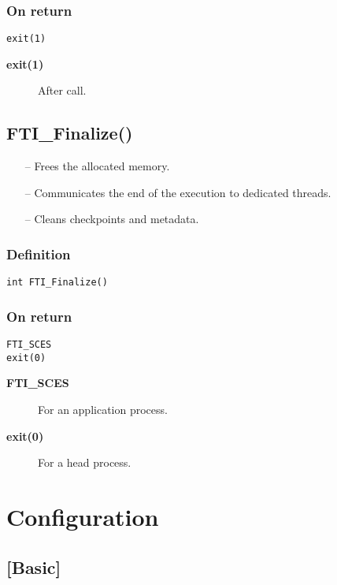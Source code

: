 \documentclass{refrep}
\begin{document}
\subsection*{On return}
\begin{lstlisting}[frame=single]
exit(1)
\end{lstlisting}
\begin{description}
\item[\textbf{exit(1)}] After call.
\end{description}
\newpage
\section{\asciifamily FTI\_Finalize()}\label{sec:ftifinalize}
\begin{framed}
\begin{itemize}
\item[--] Frees the allocated memory.
\item[--] Communicates the end of the execution to dedicated threads.
\item[--] Cleans checkpoints and metadata.
\end{itemize}
\end{framed}
\subsection*{Definition}
\begin{lstlisting}[frame=single]
int FTI_Finalize()
\end{lstlisting}
\subsection*{On return}
\begin{lstlisting}[frame=single]
FTI_SCES
exit(0)
\end{lstlisting}
\begin{description}
\item[\textbf{FTI\_SCES}] For an application process.
\item[\textbf{exit(0)}] For a head process.
\end{description}
\chapter{Configuration}\label{ch:configuration}
\section{[Basic]}\label{sec:basic}
\end{document}
